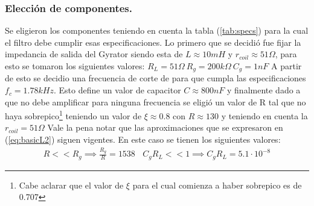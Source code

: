 \documentclass[a4paper]{article}
\begin{document}
\subsubsection{Elección de componentes.}
Se eligieron los componentes teniendo en cuenta la tabla (\ref{tab:specs}) para la cual el filtro debe cumplir esas especificaciones.
Lo primero que se decidió fue fijar la impedancia de salida del Gyrator siendo esta de $L \approx 10mH $ y $r_{coil} \approx 51\Omega $, para esto se tomaron los siguientes valores: $R_L = 51\Omega \ R_g = 200k\Omega \ C_g = 1nF$
A partir de esto se decidio una frecuencia de corte de  para que cumpla las especificaciones $f_c =1.78kHz $. Esto define un valor de capacitor $C \approx 800nF$ y finalmente dado a que no debe amplificar para ninguna frecuencia se eligió un valor de R tal que no haya sobrepico\footnote{Cabe aclarar que el valor de $\xi$ para el cual comienza a haber sobrepico es de 0.707} teniendo un valor de $\xi \approx 0.8 $ con $R \approx 130 $ y teniendo en cuenta la $r_{coil} = 51\Omega$  
Vale la pena notar que las aproximaciones que se expresaron en (\ref{eq:basicL2}) siguen vigentes. En este caso se tienen los siguientes valores:
\begin{align}  R<<R_g \implies  \frac{R_g}{R}=  1538 \ \ \ \ C_gR_L << 1 \implies C_gR_L =5.1\cdot 10^{-8} \end{align}


\end{document}

